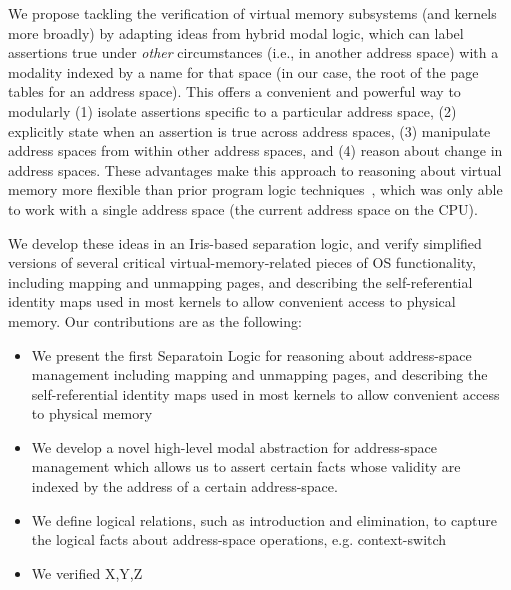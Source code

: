 We propose tackling the verification of virtual memory subsystems (and kernels more broadly) by adapting ideas from hybrid modal logic, which can label assertions true under \emph{other} circumstances (i.e., in another address space) with a modality indexed by a name for that space (in our case, the root of the page tables for an address space). This offers a convenient and powerful way to modularly (1) isolate assertions specific to a particular address space, (2) explicitly state when an assertion is true across address spaces, (3) manipulate address spaces from within other address spaces, and (4) reason about change in address spaces. These advantages make this approach to reasoning about virtual memory more flexible than prior program logic techniques~\cite{kolanski08vstte,kolanski09tphols}, which was only able to work with a single address space (the current address space on the CPU).

We develop these ideas in an Iris-based separation logic, and verify simplified versions of several critical virtual-memory-related pieces of OS functionality, including mapping and unmapping pages, and describing the self-referential identity maps used in most kernels to allow convenient access to physical memory. Our contributions are as the following:
\begin{itemize}
\item We present the first Separatoin Logic for reasoning about address-space management including mapping and unmapping pages, and describing the self-referential identity maps used in most kernels to allow convenient access to physical memory 
\item We develop a novel high-level modal abstraction for address-space management which allows us to assert certain facts whose validity are indexed by the address of a certain address-space.
\item We define logical relations, such as introduction and elimination, to capture the logical facts about address-space operations, e.g. context-switch
\item We verified X,Y,Z
 \end{itemize}


